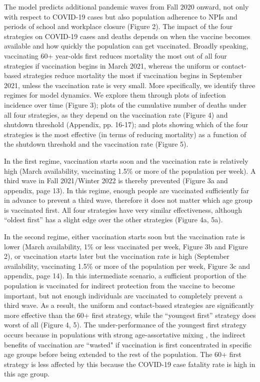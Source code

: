 The model predicts additional pandemic waves from Fall 2020 onward, not only with respect to COVID-19 cases but also population adherence to NPIs and periods of school and workplace closure (Figure 2). The impact of the four strategies on COVID-19 cases and deaths depends on when the vaccine becomes available and how quickly the population can get vaccinated. Broadly speaking, vaccinating 60+ year-olds first reduces mortality the most out of all four strategies if vaccination begins in March 2021, whereas the uniform or contact-based strategies reduce mortality the most if vaccination begins in September 2021, unless the vaccination rate is very small. More specifically, we identify three regimes for model dynamics. We explore them through plots of infection incidence over time (Figure 3); plots of the cumulative number of deaths under all four strategies, as they depend on the vaccination rate (Figure 4) and shutdown threshold (Appendix, pp. 16-17); and plots showing which of the four strategies is the most effective (in terms of reducing mortality) as a function of the shutdown threshold and the vaccination rate (Figure 5). 

In the first regime, vaccination starts soon and the vaccination rate is relatively high (March availability, vaccinating 1.5\% or more of the population per week). A third wave in Fall 2021/Winter 2022 is thereby prevented (Figure 3a and appendix, page 13).  In this regime, enough people are vaccinated sufficiently far in advance to prevent a third wave, therefore it does not matter which age group is vaccinated first. All four strategies have very similar effectiveness, although “oldest first” has a slight edge over the other strategies (Figure 4a, 5a). 

In the second regime, either vaccination starts soon but the vaccination rate is lower (March availability, 1\% or less vaccinated per week, Figure 3b and Figure 2), or vaccination starts later but the vaccination rate is high (September availability, vaccinating 1.5\% or more of the population per week, Figure 3c and appendix, page 14).  In this intermediate scenario, a sufficient proportion of the population is vaccinated for indirect protection from the vaccine to become important, but not enough individuals are vaccinated to completely prevent a third wave.  As a result, the uniform and contact-based strategies are significantly more effective than the 60+ first strategy, while the “youngest first” strategy does worst of all (Figure 4, 5).  The under-performance of the youngest first strategy occurs because in populations with strong age-assortative mixing \cite{prem2020projecting}, the indirect benefits of vaccination are “wasted" if vaccination is first concentrated in specific age groups before being extended to the rest of the population.  The 60+ first strategy is less affected by this because the COVID-19 case fatality rate is high in this age group. 

